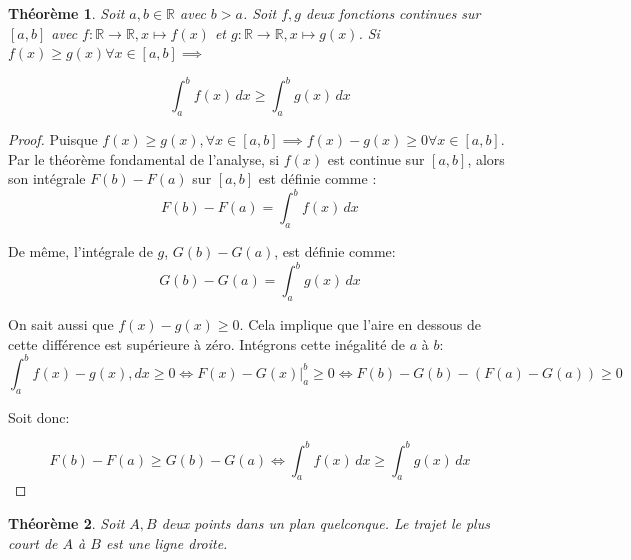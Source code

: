 \documentclass[a4paper]{amsart}
\newtheorem{theorem}{Théorème}[section]
\theoremstyle{definition}
\theoremstyle{remark}
\numberwithin{equation}{section}
\begin{document}
\begin{theorem}
  Soit $a,b\in\mathbb{R}$ avec $b>a$. Soit $f,g$ deux fonctions continues sur $[a,b]$ avec $f:\mathbb{R}\longrightarrow \mathbb{R}, x\longmapsto f(x)$ et $g:\mathbb{R}\longrightarrow \mathbb{R}, x\longmapsto g(x)$. Si $f(x)\geq g(x) \forall x\in[a,b]\implies$

  \[\int_{a}^{b}f(x) \,dx \geq \int_{a}^{b}g(x) \,dx\]
\end{theorem}

\begin{proof}
  Puisque $f(x)\geq g(x), \forall x\in[a,b] \implies f(x)-g(x)\geq 0\forall x\in[a,b] $. Par le théorème fondamental de l’analyse, si $f(x)$ est continue sur $[a,b]$, alors son intégrale $F(b)-F(a)$ sur $[a,b]$ est définie comme :
  \[F(b)-F(a) = \int_{a}^{b} f(x) \,dx\]

  De même, l'intégrale de $g$, $G(b)-G(a)$, est définie comme: \[G(b)-G(a) = \int_{a}^{b} g(x) \,dx\]

  On sait aussi que $f(x)-g(x)\geq0$. Cela implique que l'aire en dessous de cette différence est supérieure à zéro. Intégrons cette inégalité de $a$ à $b$: \[\int_{a}^{b} f(x) - g(x), dx \geq 0 \Leftrightarrow F(x)-G(x) \Biggr|_{a}^{b}\geq0 \Leftrightarrow F(b)-G(b) -(F(a)-G(a)) \geq 0 \]

  Soit donc:

  \[F(b)-F(a) \geq G(b)-G(a) \Leftrightarrow \int_{a}^{b}f(x) \,dx \geq \int_{a}^{b}g(x) \,dx\]
\end{proof}

\begin{theorem}
  Soit $A,B$ deux points dans un plan quelconque. Le trajet le plus court de $A$ à $B$ est une ligne droite.
\end{theorem}
\end{document}
